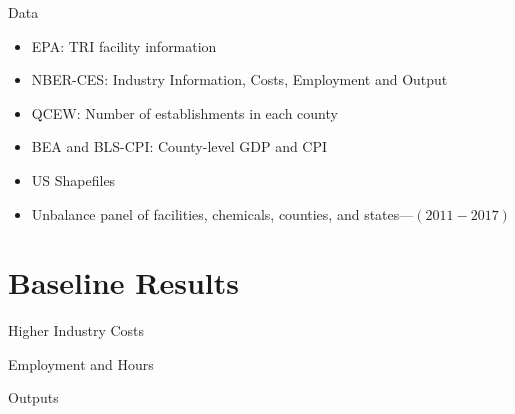 \documentclass[aspectratio = 169]{beamer}
\begin{document}
    \begin{frame}{Data}
        \begin{itemize}
            \item EPA: TRI facility information
            \item NBER-CES: Industry Information, Costs, Employment and Output
            \item QCEW: Number of establishments in each county
            \item BEA and BLS-CPI: County-level GDP and CPI
            \item US Shapefiles
            \item Unbalance panel of facilities, chemicals, counties, and states---$(2011-2017)$
        \end{itemize}
        \hypertarget{Summary Table}{}
        \hyperlink{tab:summary-table}{}
        \hypertarget{Balance Test Counties}{}
        \hyperlink{tab:balance-test-counties}{}
        \hypertarget{Balance Test States}{}
        \hyperlink{tab:balance-test-states}{}
    \end{frame}


    \section{Baseline Results}\label{sec:baseline-results}
    \begin{frame}[shrink = 30]{Higher Industry Costs}
        
        \hypertarget{Industry Costs}{}
        \hyperlink{tab:baseline-costs}{}
        \hypertarget{Skilled Costs}{}
        \hyperlink{tab:baseline-costs-skilled}{}
    \end{frame}

    \begin{frame}[shrink = 30]{Employment and Hours}
        
        \hypertarget{Employment and Hours}{}
        \hyperlink{tab:baseline-employment-hours}{}
        \hypertarget{Cross-County Worker Mobility}{}
        \hyperlink{tab:baseline-worker-mobility}{}
        \hypertarget{Employment Skilled}{}
        \hyperlink{fig:baseline-employment-skilled}{}
    \end{frame}

    \begin{frame}[shrink = 30]{Outputs}
        
        \hypertarget{Outputs}{}
        \hyperlink{tab:baseline-outputs}{}
    \end{frame}
\end{document}
